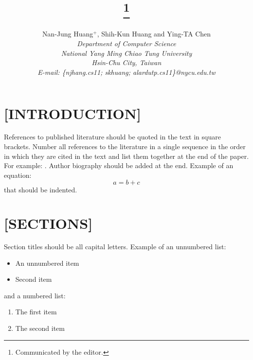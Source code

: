 \documentclass[10pt,a4paper,twoside]{article}
\title{\paperTitle\thanks{Communicated by the editor.}}
\author{Nan-Jung Huang{\small$^+$}, Shih-Kun Huang and Ying-TA Chen\\
  {\small\em Department of Computer Science} \\
  {\small\em National Yang Ming Chiao Tung University}\\
  {\small\em Hsin-Chu City, Taiwan}\\
  {\small\em E-mail: \{njhang.cs11; skhuang; alardutp.cs11\}@nycu.edu.tw}
}
\begin{document}
\maketitle

\iffalse
\begin{abstract}
  All papers must be supplied with an abstract and 5–10 keywords (or key phrases). The abstract should be brief, concise, and complete in itself. Include purpose, methodology, results, and conclusion, where applicable. The keywords (or key phrases) should be as independent as possible, and jointly reflect the main topic of the paper.
  \begin{keywords}
  wireless sensor networks, localization, mobile beacon, mobile anchor, multiple processes
  \end{keywords}
\end{abstract}
\else

\fi









\iffalse
\section*{[INTRODUCTION]}

References to published literature should be quoted in the text in square brackets. Number all references to the literature in a single sequence in the order in which they are cited in the text and list them together at the end of the paper. For example: \cite{Wang1987,duda1973,ramachandran1983,CMU-CS-85-158,OReilly1979}. Author biography should be added at the end.
Example of an equation:
\begin{equation}
  a=b+c
\end{equation}
that should be indented. 


\section*{[SECTIONS]}
\label{sec:sec}
Section titles should be all capital letters. Example of an unnumbered list:
\begin{itemize}
  \item {An unnumbered item}
  \item {Second item}
\end{itemize}
and a numbered list:
\begin{enumerate}
  \item The first item
  \item The second item
\end{enumerate}
\end{document}
